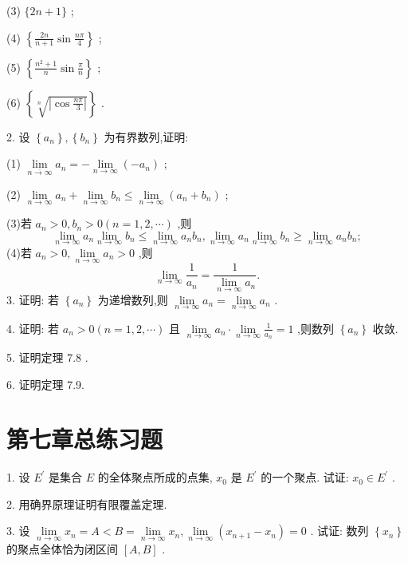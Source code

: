 (3) \(\{ {{2n} + 1}\}\) ;

(4) \(\left\{  {\frac{2n}{n + 1}\sin \frac{n\pi }{4}}\right\}\) ;

(5) \(\left\{  {\frac{{n}^{2} + 1}{n}\sin \frac{\pi }{n}}\right\}\) ;

(6) \(\left\{  \sqrt[n]{\left| \cos \frac{n\pi }{3}\right| }\right\}\) .

2. 设 \(\left\{  {a}_{n}\right\}  ,\left\{  {b}_{n}\right\}\) 为有界数列,证明:

(1) \(\mathop{\lim }\limits_{\overline{n \rightarrow  \infty }}{a}_{n} =  - \mathop{\lim }\limits_{{n \rightarrow  \infty }}\left( {-{a}_{n}}\right)\) ;

(2) \(\mathop{\lim }\limits_{{n \rightarrow  \infty }}{a}_{n} + \mathop{\lim }\limits_{{n \rightarrow  \infty }}{b}_{n} \leq  \mathop{\lim }\limits_{{n \rightarrow  \infty }}\left( {{a}_{n} + {b}_{n}}\right)\) ;

(3)若 \({a}_{n} > 0,{b}_{n} > 0\left( {n = 1,2,\cdots }\right)\) ,则
\[
\mathop{\lim }\limits_{{n \rightarrow  \infty }}{a}_{n}\mathop{\lim }\limits_{{n \rightarrow  \infty }}{b}_{n} \leq  \mathop{\lim }\limits_{{n \rightarrow  \infty }}{a}_{n}{b}_{n},\mathop{\lim }\limits_{{n \rightarrow  \infty }}{a}_{n}\mathop{\lim }\limits_{{n \rightarrow  \infty }}{b}_{n} \geq  \mathop{\lim }\limits_{{n \rightarrow  \infty }}{a}_{n}{b}_{n};
\]
(4)若 \({a}_{n} > 0,\mathop{\lim }\limits_{{n \rightarrow  \infty }}{a}_{n} > 0\) ,则
\[
\mathop{\lim }\limits_{{n \rightarrow  \infty }}\frac{1}{{a}_{n}} = \frac{1}{\mathop{\lim }\limits_{{n \rightarrow  \infty }}{a}_{n}}.
\]
3. 证明: 若 \(\left\{  {a}_{n}\right\}\) 为递增数列,则 \(\mathop{\lim }\limits_{{n \rightarrow  \infty }}{a}_{n} = \mathop{\lim }\limits_{{n \rightarrow  \infty }}{a}_{n}\) .

4. 证明: 若 \({a}_{n} > 0\left( {n = 1,2,\cdots }\right)\) 且 \(\mathop{\lim }\limits_{{n \rightarrow  \infty }}{a}_{n} \cdot  \mathop{\lim }\limits_{{n \rightarrow  \infty }}\frac{1}{{a}_{n}} = 1\) ,则数列 \(\left\{  {a}_{n}\right\}\) 收敛.

5. 证明定理 7.8 .

6. 证明定理 7.9.

\section{第七章总练习题}

1. 设 \({E}^{\prime }\) 是集合 \(E\) 的全体聚点所成的点集, \({x}_{0}\) 是 \({E}^{\prime }\) 的一个聚点. 试证: \({x}_{0} \in  {E}^{\prime }\) .

2. 用确界原理证明有限覆盖定理.

3. 设 \(\mathop{\lim }\limits_{{n \rightarrow  \infty }}{x}_{n} = A < B = \mathop{\lim }\limits_{{n \rightarrow  \infty }}{x}_{n},\mathop{\lim }\limits_{{n \rightarrow  \infty }}\left( {{x}_{n + 1} - {x}_{n}}\right)  = 0\) . 试证: 数列 \(\left\{  {x}_{n}\right\}\) 的聚点全体恰为闭区间 \(\left\lbrack  {A,B}\right\rbrack\) .


